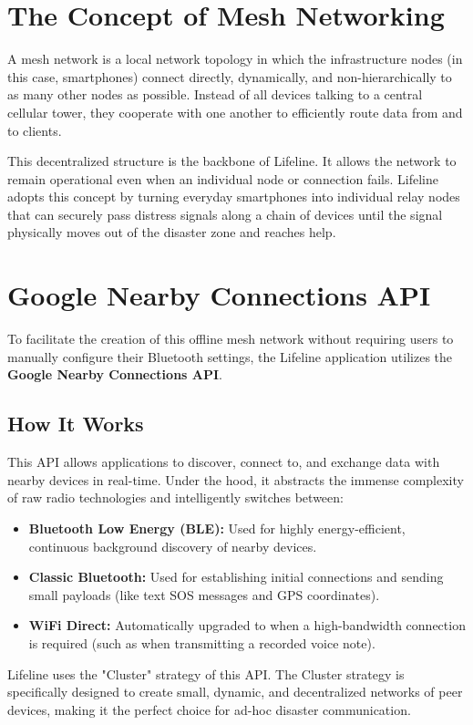 \section{The Concept of Mesh Networking}
A mesh network is a local network topology in which the infrastructure nodes (in this case, smartphones) connect directly, dynamically, and non-hierarchically to as many other nodes as possible. Instead of all devices talking to a central cellular tower, they cooperate with one another to efficiently route data from and to clients. 

This decentralized structure is the backbone of Lifeline. It allows the network to remain operational even when an individual node or connection fails. Lifeline adopts this concept by turning everyday smartphones into individual relay nodes that can securely pass distress signals along a chain of devices until the signal physically moves out of the disaster zone and reaches help.

\section{Google Nearby Connections API}
To facilitate the creation of this offline mesh network without requiring users to manually configure their Bluetooth settings, the Lifeline application utilizes the \textbf{Google Nearby Connections API}. 

\subsection{How It Works}
This API allows applications to discover, connect to, and exchange data with nearby devices in real-time. Under the hood, it abstracts the immense complexity of raw radio technologies and intelligently switches between:
\begin{itemize}
    \item \textbf{Bluetooth Low Energy (BLE):} Used for highly energy-efficient, continuous background discovery of nearby devices.
    \item \textbf{Classic Bluetooth:} Used for establishing initial connections and sending small payloads (like text SOS messages and GPS coordinates).
    \item \textbf{WiFi Direct:} Automatically upgraded to when a high-bandwidth connection is required (such as when transmitting a recorded voice note).
\end{itemize}

Lifeline uses the "Cluster" strategy of this API. The Cluster strategy is specifically designed to create small, dynamic, and decentralized networks of peer devices, making it the perfect choice for ad-hoc disaster communication.
